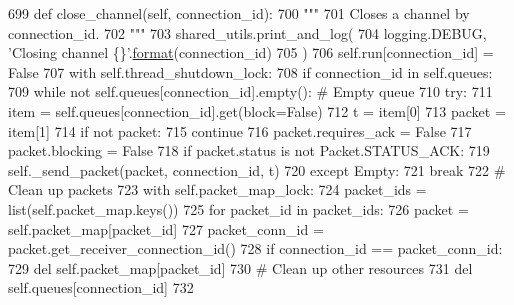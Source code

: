 \begin{DoxyCode}
699     \textcolor{keyword}{def }close\_channel(self, connection\_id):
700         \textcolor{stringliteral}{"""}
701 \textcolor{stringliteral}{        Closes a channel by connection\_id.}
702 \textcolor{stringliteral}{        """}
703         shared\_utils.print\_and\_log(
704             logging.DEBUG, \textcolor{stringliteral}{'Closing channel \{\}'}.\hyperlink{namespaceparlai_1_1chat__service_1_1services_1_1messenger_1_1shared__utils_a32e2e2022b824fbaf80c747160b52a76}{format}(connection\_id)
705         )
706         self.run[connection\_id] = \textcolor{keyword}{False}
707         with self.thread\_shutdown\_lock:
708             \textcolor{keywordflow}{if} connection\_id \textcolor{keywordflow}{in} self.queues:
709                 \textcolor{keywordflow}{while} \textcolor{keywordflow}{not} self.queues[connection\_id].empty():  \textcolor{comment}{# Empty queue}
710                     \textcolor{keywordflow}{try}:
711                         item = self.queues[connection\_id].get(block=\textcolor{keyword}{False})
712                         t = item[0]
713                         packet = item[1]
714                         \textcolor{keywordflow}{if} \textcolor{keywordflow}{not} packet:
715                             \textcolor{keywordflow}{continue}
716                         packet.requires\_ack = \textcolor{keyword}{False}
717                         packet.blocking = \textcolor{keyword}{False}
718                         \textcolor{keywordflow}{if} packet.status \textcolor{keywordflow}{is} \textcolor{keywordflow}{not} Packet.STATUS\_ACK:
719                             self.\_send\_packet(packet, connection\_id, t)
720                     \textcolor{keywordflow}{except} Empty:
721                         \textcolor{keywordflow}{break}
722                 \textcolor{comment}{# Clean up packets}
723                 with self.packet\_map\_lock:
724                     packet\_ids = list(self.packet\_map.keys())
725                     \textcolor{keywordflow}{for} packet\_id \textcolor{keywordflow}{in} packet\_ids:
726                         packet = self.packet\_map[packet\_id]
727                         packet\_conn\_id = packet.get\_receiver\_connection\_id()
728                         \textcolor{keywordflow}{if} connection\_id == packet\_conn\_id:
729                             del self.packet\_map[packet\_id]
730                 \textcolor{comment}{# Clean up other resources}
731                 del self.queues[connection\_id]
732 
\end{DoxyCode}
\mbox{\label{classparlai_1_1mturk_1_1core_1_1socket__manager_1_1SocketManager_a17a6ebab4a3c0e2882ba01398f2e9df1}} 
